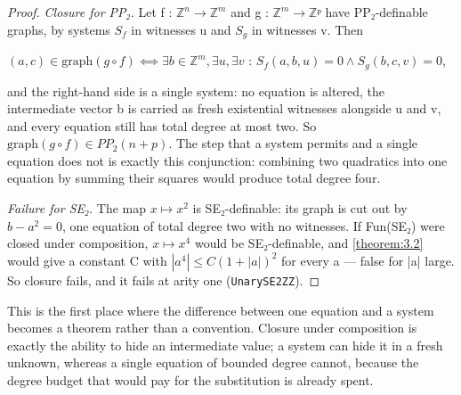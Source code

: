 \documentclass[11pt]{article}
\theoremstyle{plain}
\theoremstyle{definition}
\theoremstyle{remark}
\theoremstyle{plain}
\theoremstyle{definition}
\theoremstyle{remark}
\theoremstyle{plain}
\theoremstyle{definition}
\theoremstyle{remark}
\begin{document}
\begin{proof}
\emph{Closure for PP₂.} Let f : $ℤ^{n} → ℤ^{m}$ and g : $ℤ^{m} → ℤᵖ$ have PP₂-definable graphs, by systems $S_{f}$ in witnesses u and $S_{g}$ in witnesses v. Then

$(a, c) ∈ \mathrm{graph}(g ∘ f) ⟺ ∃ b ∈ ℤ^{m}, ∃u, ∃v$ : $S_{f}(a, b, u) = 0 ∧ S_{g}(b, c, v) = 0$,

and the right-hand side is a single system: no equation is altered, the intermediate vector b is carried as fresh existential witnesses alongside u and v, and every equation still has total degree at most two. So $\mathrm{graph}(g ∘ f) ∈ PP_{2}(n+p)$. The step that a system permits and a single equation does not is exactly this conjunction: combining two quadratics into one equation by summing their squares would produce total degree four.

\emph{Failure for SE₂.} The map $x ↦ x^{2}$ is SE₂-definable: its graph is cut out by $b − a^{2} = 0$, one equation of total degree two with no witnesses. If Fun(SE₂) were closed under composition, $x ↦ x^{4}$ would be SE₂-definable, and \cref{theorem:3.2} would give a constant C with $|a^{4}| ≤ C(1+|a|)^{2}$ for every a — false for |a| large. So closure fails, and it fails at arity one (\texttt{UnarySE2ZZ}).

\end{proof}
This is the first place where the difference between one equation and a system becomes a theorem rather than a convention. Closure under composition is exactly the ability to hide an intermediate value; a system can hide it in a fresh unknown, whereas a single equation of bounded degree cannot, because the degree budget that would pay for the substitution is already spent.
\end{document}

